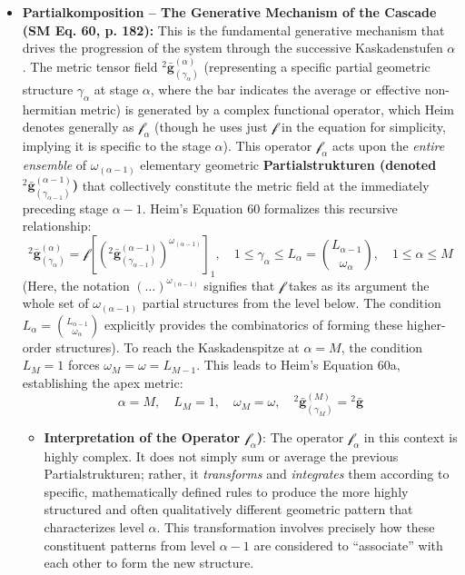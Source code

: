 \documentclass[12pt]{article}
\newcommand{\q}[1]{\enquote{#1}}
\newcommand{\kaskadenstufe}{\alpha}
\begin{document}
\begin{itemize}
    \item \textbf{Partialkomposition – The Generative Mechanism of the Cascade (SM Eq. 60, p. 182):}
    This is the fundamental generative mechanism that drives the progression of the system through the successive Kaskadenstufen \( \kaskadenstufe \). The metric tensor field \( {}^2\bar{\mathbf{g}}^{(\alpha)}_{(\gamma_{\alpha})} \) (representing a specific partial geometric structure \( \gamma_\alpha \) at stage \( \alpha \), where the bar indicates the average or effective non-hermitian metric) is generated by a complex functional operator, which Heim denotes generally as \( \mathcal{f}_\alpha \) (though he uses just \( \mathcal{f} \) in the equation for simplicity, implying it is specific to the stage \( \alpha \)). This operator \( \mathcal{f}_\alpha \) acts upon the \textit{entire ensemble} of \( \omega_{(\alpha-1)} \) elementary geometric \textbf{Partialstrukturen (denoted \( {}^2\bar{\mathbf{g}}^{(\alpha-1)}_{(\gamma_{\alpha-1})} \))} that collectively constitute the metric field at the immediately preceding stage \( \alpha-1 \). Heim's Equation 60 formalizes this recursive relationship:
    \begin{equation}
    {}^{2}\bar{\mathbf{g}}^{(\alpha)}_{(\gamma_{\alpha})} = \mathcal{f} \left[ ({}^{2}\bar{\mathbf{g}}^{(\alpha-1)}_{(\gamma_{\alpha-1})})^{\omega_{(\alpha-1)}} \right]_1, \quad 1 \le \gamma_\alpha \le L_\alpha = \binom{L_{\alpha-1}}{\omega_\alpha}, \quad 1 \le \alpha \le M
    \label{eq:original_partialkomposition}
    \end{equation}
    (Here, the notation \( (\dots)^{\omega_{(\alpha-1)}} \) signifies that \( \mathcal{f} \) takes as its argument the whole set of \( \omega_{(\alpha-1)} \) partial structures from the level below. The condition $L_\alpha = \binom{L_{\alpha-1}}{\omega_\alpha}$ explicitly provides the combinatorics of forming these higher-order structures). To reach the Kaskadenspitze at $\alpha = M$, the condition $L_M = 1$ forces $\omega_M = \omega = L_{M-1}$. This leads to Heim's Equation 60a, establishing the apex metric:
    \begin{equation}
    \alpha=M, \quad L_M=1, \quad \omega_M = \omega, \quad {}^2\bar{\mathbf{g}}^{(M)}_{(\gamma_{M})} = {}^2\bar{\mathbf{g}}
    \label{eq:original_kaskadenspitze}
    \end{equation}
    \begin{itemize}
        \item \textbf{Interpretation of the Operator \( \mathcal{f}_\alpha \))}: The operator \( \mathcal{f}_\alpha \) in this context is highly complex. It does not simply sum or average the previous Partialstrukturen; rather, it \textit{transforms} and \textit{integrates} them according to specific, mathematically defined rules to produce the more highly structured and often qualitatively different geometric pattern that characterizes level \( \alpha \). This transformation involves precisely how these constituent patterns from level \( \alpha-1 \) are considered to \q{associate} with each other to form the new structure.
    \end{itemize}


\end{itemize}
\end{document}
